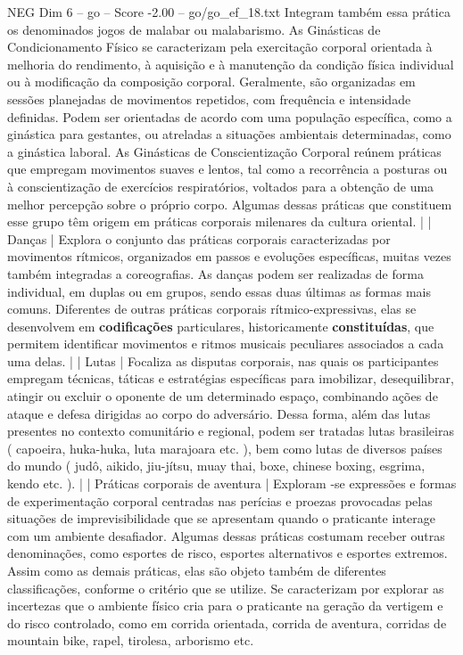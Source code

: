 \begin{textsample}{NEG Dim 6 – go – Score -2.00 – go/go\_ef\_18.txt}
Integram também essa prática os denominados jogos de malabar ou malabarismo.
As Ginásticas de Condicionamento Físico se caracterizam pela exercitação corporal orientada à melhoria do rendimento, à aquisição e à manutenção da condição física individual ou à modificação da composição corporal.
Geralmente, são organizadas em sessões planejadas de movimentos repetidos, com frequência e intensidade definidas.
Podem ser orientadas de acordo com uma população específica, como a ginástica para gestantes, ou atreladas a situações ambientais determinadas, como a ginástica laboral.
As Ginásticas de Conscientização Corporal reúnem práticas que empregam movimentos suaves e lentos, tal como a recorrência a posturas ou à conscientização de exercícios respiratórios, voltados para a obtenção de uma melhor percepção sobre o próprio corpo.
Algumas dessas práticas que constituem esse grupo têm origem em práticas corporais milenares da cultura oriental. | | Danças | Explora o conjunto das práticas corporais caracterizadas por movimentos rítmicos, organizados em passos e evoluções específicas, muitas vezes também integradas a coreografias.
As danças podem ser realizadas de forma individual, em duplas ou em grupos, sendo essas duas últimas as formas mais comuns.
Diferentes de outras práticas corporais rítmico-expressivas, elas se desenvolvem em \textbf{codificações} particulares, historicamente \textbf{constituídas}, que permitem identificar movimentos e ritmos musicais peculiares associados a cada uma delas. | | Lutas | Focaliza as disputas corporais, nas quais os participantes empregam técnicas, táticas e estratégias específicas para imobilizar, desequilibrar, atingir ou excluir o oponente de um determinado espaço, combinando ações de ataque e defesa dirigidas ao corpo do adversário.
Dessa forma, além das lutas presentes no contexto comunitário e regional, podem ser tratadas lutas brasileiras ( capoeira, huka-huka, luta marajoara etc. ), bem como lutas de diversos países do mundo ( judô, aikido, jiu-jítsu, muay thai, boxe, chinese boxing, esgrima, kendo etc. ). | | Práticas corporais de aventura | Exploram -se expressões e formas de experimentação corporal centradas nas perícias e proezas provocadas pelas situações de imprevisibilidade que se apresentam quando o praticante interage com um ambiente desafiador.
Algumas dessas práticas costumam receber outras denominações, como esportes de risco, esportes alternativos e esportes extremos.
Assim como as demais práticas, elas são objeto também de diferentes classificações, conforme o critério que se utilize.
Se caracterizam por explorar as incertezas que o ambiente físico cria para o praticante na geração da vertigem e do risco controlado, como em corrida orientada, corrida de aventura, corridas de mountain bike, rapel, tirolesa, arborismo etc.

\end{textsample}
